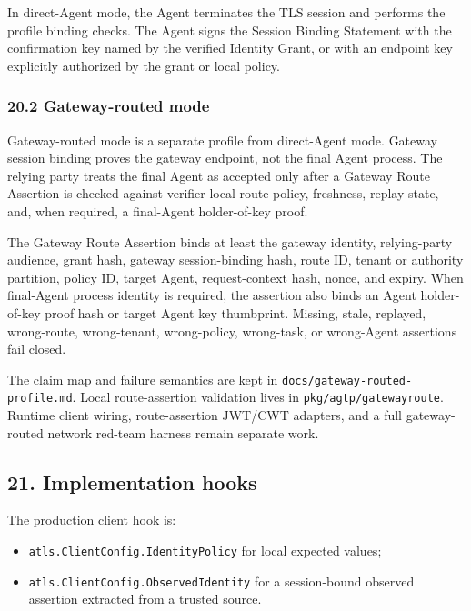 \documentclass[
]{article}
\providecommand{\tightlist}{%
  \setlength{\itemsep}{0pt}\setlength{\parskip}{0pt}}
\begin{document}
In direct-Agent mode, the Agent terminates the TLS session and performs
the profile binding checks. The Agent signs the Session Binding
Statement with the confirmation key named by the verified Identity Grant,
or with an endpoint key explicitly authorized by the grant or local
policy.

\subsubsection{20.2 Gateway-routed mode}\label{gateway-routed-mode}

Gateway-routed mode is a separate profile from direct-Agent mode.
Gateway session binding proves the gateway endpoint, not the final Agent
process. The relying party treats the final Agent as accepted only after
a Gateway Route Assertion is checked against verifier-local route policy,
freshness, replay state, and, when required, a final-Agent
holder-of-key proof.

The Gateway Route Assertion binds at least the gateway identity,
relying-party audience, grant hash, gateway session-binding hash, route
ID, tenant or authority partition, policy ID, target Agent,
request-context hash, nonce, and expiry. When final-Agent process
identity is required, the assertion also binds an Agent holder-of-key
proof hash or target Agent key thumbprint. Missing, stale, replayed,
wrong-route, wrong-tenant, wrong-policy, wrong-task, or wrong-Agent
assertions fail closed.

The claim map and failure semantics are kept in
\texttt{docs/gateway-routed-profile.md}. Local route-assertion
validation lives in \texttt{pkg/agtp/gatewayroute}. Runtime client
wiring, route-assertion JWT/CWT adapters, and a full gateway-routed
network red-team harness remain separate work.

\subsection{21. Implementation hooks}\label{implementation-hooks}

The production client hook is:

\begin{itemize}
\tightlist
\item
  \texttt{atls.ClientConfig.IdentityPolicy} for local expected values;
\item
  \texttt{atls.ClientConfig.ObservedIdentity} for a session-bound
  observed assertion extracted from a trusted source.
\end{itemize}
\end{document}
